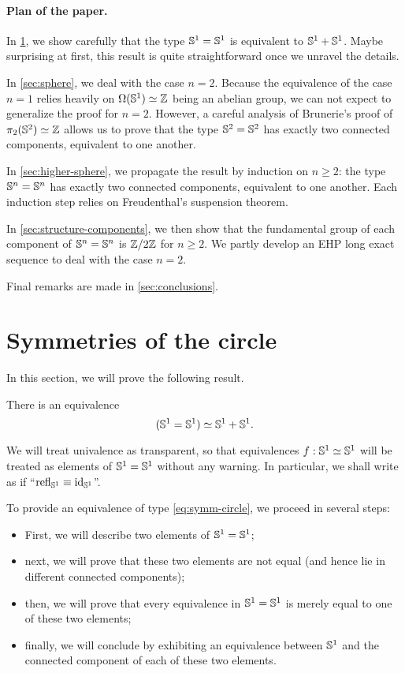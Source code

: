 \documentclass[english,a4paper]{lmcs}
\begin{document}
\paragraph{Plan of the paper.}
In \cref{sec:circle-case}, we show carefully that the type ${{\mathbb S^{1}}} = {{\mathbb S^{1}}}$
is equivalent to ${{\mathbb S^{1}}} + {{\mathbb S^{1}}}$. Maybe surprising at first, this result
is quite straightforward once we unravel the details.

In \cref{sec:sphere}, we deal with the case $n=2$. Because the
equivalence of the case $n=1$ relies heavily on $\Omega({{\mathbb S^{1}}})\simeq \mathbb{Z}$
being an abelian group, we can not expect to generalize the proof for
$n=2$. However, a careful analysis of Brunerie's proof of
$\pi_2({{\mathbb S^{2}}}) \simeq \mathbb{Z}$ allows us to prove that the type ${{\mathbb S^{2}}}={{\mathbb S^{2}}}$ has
exactly two connected components, equivalent to one another.

In \cref{sec:higher-sphere}, we propagate the result by induction on
$n\geq 2$: the type ${\mathbb S^{n}} = {\mathbb S^{n}}$ has exactly two connected
components, equivalent to one another. Each induction step relies on
Freudenthal's suspension theorem.


In \cref{sec:structure-components}, we then show that the fundamental group
of each component of ${\mathbb S^{n}} = {\mathbb S^{n}}$ is $\mathbb{Z}/2\mathbb{Z}$ for $n\ge2$.
We partly develop an EHP long exact sequence to deal with the case $n=2$.

Final remarks are made in \cref{sec:conclusions}.

\section{Symmetries of the circle}
\label{sec:circle-case}%

In this section, we will prove the following result.
\begin{thm}
  \label{thm:symmetries-of-S1}
  There is an equivalence
  \begin{equation}
    \label{eq:symm-circle}%
    (\Sc = \Sc) \weq \Sc+\Sc.
  \end{equation}
\end{thm}
We will treat univalence as transparent, so that equivalences
$f:{{\mathbb S^{1}}}\simeq {{\mathbb S^{1}}}$ will be treated as elements of ${{\mathbb S^{1}}}={{\mathbb S^{1}}}$ without any
warning. In particular, we shall write as if
``$\mathop{{\mathrm{refl}}_{{{\mathbb S^{1}}}}} \equiv \mathord{\mathrm{id}}_{{\mathbb S^{1}}}$''.

To provide an equivalence of type \cref{eq:symm-circle}, we proceed
in several steps:
\begin{itemize}
\item First, we will describe two elements of ${{\mathbb S^{1}}}={{\mathbb S^{1}}}$;
\item next, we will prove that these two elements are not equal (and
hence lie in different connected components);
\item then, we will prove that every equivalence in ${{\mathbb S^{1}}}={{\mathbb S^{1}}}$ is
  merely equal to one of these two elements;
\item finally, we will conclude by exhibiting an equivalence between
  ${{\mathbb S^{1}}}$ and the connected component of each of these two elements.
\end{itemize}
\end{document}
